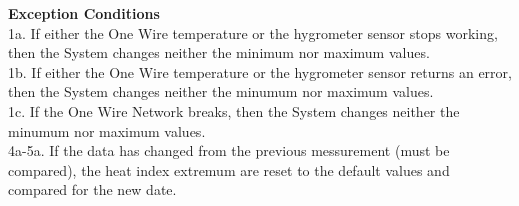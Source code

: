 \documentclass[letterpaper]{article}
\begin{document}
\textbf{Exception Conditions}\\
1a.  If either the One Wire temperature or the hygrometer sensor
stops working, then the System changes neither the minimum nor
maximum values.\\
1b.  If either the One Wire temperature  or the hygrometer sensor
returns an error, then the System changes neither the minumum nor
maximum values.\\
1c.  If the One Wire Network breaks, then the System changes neither
the minumum nor maximum values.\\
4a-5a.  If the data has changed from the previous messurement (must be
compared), the  heat index extremum are reset to the default
values and compared for the new date.
\end{document}
